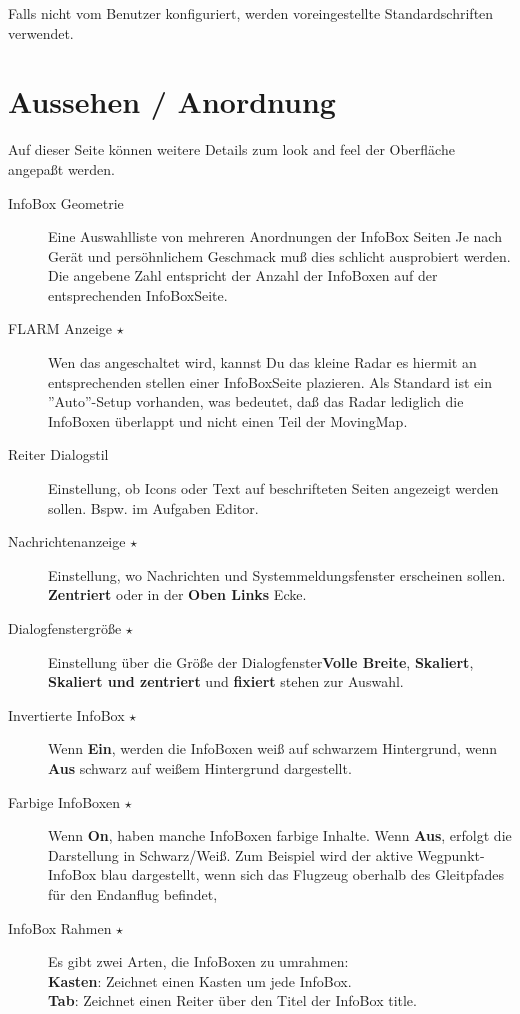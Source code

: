 
Falls nicht vom Benutzer konfiguriert, werden voreingestellte Standardschriften verwendet.

\section{Aussehen / Anordnung}\label{sec:interface-appearance}

Auf dieser Seite können weitere Details zum look and feel der Oberfläche
angepaßt werden.


\begin{description}
\item[InfoBox Geometrie]  Eine Auswahlliste von mehreren Anordnungen der InfoBox Seiten Je nach Gerät und persöhnlichem
Geschmack muß dies schlicht ausprobiert werden. Die angebene Zahl entspricht der Anzahl der InfoBoxen auf der entsprechenden InfoBoxSeite.
\item[FLARM Anzeige $\star$]  \label{conf:flarmradar-place}
Wen das \fl angeschaltet wird, kannst Du das kleine \fl Radar es hiermit an entsprechenden stellen einer InfoBoxSeite plazieren.
Als Standard ist ein ''Auto''-Setup vorhanden, was bedeutet, daß das Radar lediglich die InfoBoxen
überlappt und nicht einen Teil der MovingMap.
\item[Reiter Dialogstil] Einstellung, ob Icons oder Text auf beschrifteten Seiten angezeigt werden sollen.
Bspw. im Aufgaben Editor.
\item[Nachrichtenanzeige $\star$]  Einstellung, wo Nachrichten und Systemmeldungsfenster
erscheinen sollen.   {\bf Zentriert} oder in der {\bf Oben Links} Ecke.
\item[Dialogfenstergröße $\star$]  Einstellung über die Größe der Dialogfenster{\bf Volle Breite},  {\bf Skaliert},  {\bf Skaliert und zentriert} und {\bf fixiert} stehen zur Auswahl.
\item[Invertierte InfoBox $\star$]  Wenn {\bf Ein}, werden die InfoBoxen weiß auf schwarzem Hintergrund, wenn {\bf Aus} schwarz auf weißem Hintergrund dargestellt.
\item[Farbige InfoBoxen $\star$]  Wenn {\bf On}, haben manche InfoBoxen farbige Inhalte. Wenn {\bf Aus}, erfolgt die Darstellung in Schwarz/Weiß.
Zum Beispiel wird der aktive Wegpunkt-InfoBox  blau dargestellt, wenn sich das Flugzeug oberhalb des Gleitpfades für den Endanflug  befindet,
\item[InfoBox Rahmen $\star$]  Es gibt zwei Arten, die InfoBoxen zu umrahmen:\\
  {\bf Kasten}: Zeichnet einen Kasten um jede InfoBox.\\
  {\bf Tab}: Zeichnet einen Reiter über den Titel der InfoBox
  title. \\
\end{description}


